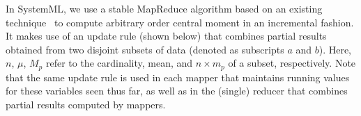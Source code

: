 
In SystemML, we use a stable MapReduce algorithm based on an existing technique~\cite{cm} to compute arbitrary order central moment in an incremental fashion. It makes use of an update rule (shown below) that combines partial results obtained from two disjoint subsets of data (denoted as subscripts $a$ and $b$). Here, $n$, $\mu$, $M_p$ refer to the cardinality, mean, and $n\times m_p$ of a subset, respectively. Note that the same update rule is used in each mapper that maintains running values for these variables seen thus far, as well as in the (single) reducer that combines partial results computed by mappers. 


